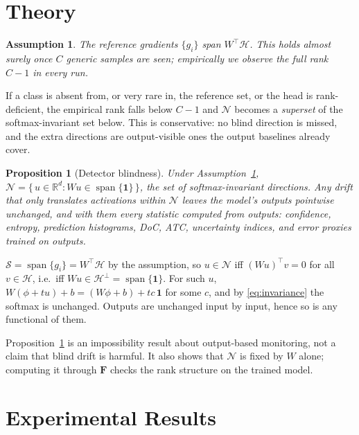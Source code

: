 \documentclass[conference]{IEEEtran}
\newtheorem{proposition}{Proposition}
\newtheorem{assumption}{Assumption}
\newcommand{\R}{\mathbb{R}}
\newcommand{\F}{\mathbf{F}}
\newcommand{\act}{\phi}
\DeclareMathOperator{\spn}{span}
\begin{document}
\section{Theory}
\label{sec:theory}

\begin{assumption}
\label{ass:span}
The reference gradients $\{g_i\}$ span $W^\top\!\mathcal{H}$. This holds
almost surely once $C$ generic samples are seen; empirically we observe the
full rank $C-1$ in every run.
\end{assumption}

If a class is absent from, or very rare in, the reference set, or the head is
rank-deficient, the empirical rank falls below $C-1$ and $\mathcal{N}$ becomes
a \emph{superset} of the softmax-invariant set below. This is conservative: no
blind direction is missed, and the extra directions are output-visible ones
the output baselines already cover.

\begin{proposition}[Detector blindness]
\label{prop:blind}
Under Assumption~\ref{ass:span},
$\mathcal{N} = \{\, u \in \R^d : Wu \in \spn\{\mathbf{1}\} \,\}$, the set of
softmax-invariant directions. Any drift that only translates activations
within $\mathcal{N}$ leaves the model's outputs pointwise unchanged, and with
them every statistic computed from outputs: confidence, entropy, prediction
histograms, DoC, ATC, uncertainty indices, and error proxies trained on
outputs.
\end{proposition}

\begin{IEEEproof}
$\mathcal{S} = \spn\{g_i\} = W^\top\!\mathcal{H}$ by the assumption, so
$u \in \mathcal{N}$ iff $(Wu)^\top v = 0$ for all $v \in \mathcal{H}$, i.e.\
iff $Wu \in \mathcal{H}^\perp = \spn\{\mathbf{1}\}$. For such $u$,
$W(\act + tu) + b = (W\act + b) + tc\,\mathbf{1}$ for some $c$, and by
\eqref{eq:invariance} the softmax is unchanged. Outputs are unchanged input by
input, hence so is any functional of them.
\end{IEEEproof}

Proposition~\ref{prop:blind} is an impossibility result about output-based
monitoring, not a claim that blind drift is harmful. It also shows that
$\mathcal{N}$ is fixed by $W$ alone; computing it through $\F$ checks the rank
structure on the trained model.

\section{Experimental Results}
\label{sec:experiments}
\end{document}
